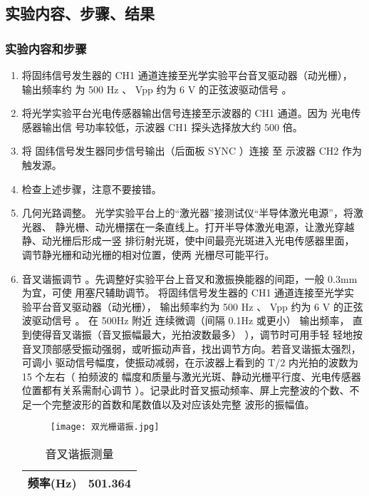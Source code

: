 \documentclass[dvipsnames, svgnames,a4paper,11pt]{article}
\begin{document}
\subsection{实验内容、步骤、结果}
\subsubsection{实验内容和步骤}
\begin{enumerate}
    \item 将固纬信号发生器的 CH1 通道连接至光学实验平台音叉驱动器（动光栅）， 输出频率约
    为 500 Hz 、 Vpp 约为 6 V 的正弦波驱动信号 。
    \item 将光学实验平台光电传感器输出信号连接至示波器的 CH1 通道。因为 光电传感器输出信
    号功率较低，示波器 CH1 探头选择放大约 500 倍。
    \item 将 固纬信号发生器同步信号输出（后面板 SYNC ）连接 至 示波器 CH2 作为触发源。
    \item 检查上述步骤，注意不要接错。
    \item 几何光路调整。 光学实验平台上的“激光器”接测试仪“半导体激光电源”，将激光器、
    静光栅、动光栅摆在一条直线上。打开半导体激光电源，让激光穿越静、动光栅后形成一竖
    排衍射光斑，使中间最亮光斑进入光电传感器里面，调节静光栅和动光栅的相对位置，使两
    光栅尽可能平行。
    \item 音叉谐振调节 。先调整好实验平台上音叉和激振换能器的间距，一般 0.3mm 为宜，可使
    用塞尺辅助调节。 将固纬信号发生器的 CH1 通道连接至光学实验平台音叉驱动器（动光栅），
    输出频率约为 500 Hz 、 Vpp 约为 6 V 的正弦波驱动信号 。 在 500Hz 附近 连续微调（间隔 0.1Hz
    或更小） 输出频率， 直到使得音叉谐振（音叉振幅最大，光拍波数最多） ），调节时可用手轻
    轻地按音叉顶部感受振动强弱，或听振动声音，找出调节方向。若音叉谐振太强烈，可调小
    驱动信号幅度，使振动减弱，在示波器上看到的 T/2 内光拍的波数为 15 个左右（ 拍频波的
    幅度和质量与激光光斑、静动光栅平行度、光电传感器位置都有关系需耐心调节 ）。记录此时音叉振动频率、屏上完整波的个数、不足一个完整波形的首数和尾数值以及对应该处完整
    波形的振幅值。
    \begin{figure}[H]
        \centering
        \texttt{[image: 双光栅谐振.jpg]}
    \end{figure}
        \begin{table}[H]
            \centering
            \caption{音叉谐振测量}
            \begin{tabular}{|c|c|}
                \hline
                频率(Hz)&501.364\\
                \hline

\end{tabular}
\end{table}
\end{enumerate}
\end{document}
